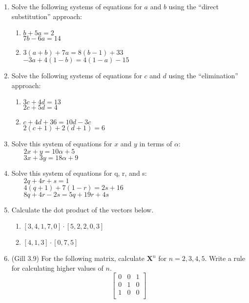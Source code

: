 \documentclass[11pt]{article}
\begin{document}
\begin{enumerate}
\item Solve the following systems of equations for $a$ and $b$ using the ``direct substitution'' approach:
\begin{enumerate}
\item $b + 5a = 2$ \\ $7b - 6a = 14$ %
\item $3(a+b) + 7a = 8(b-1) + 33$ \\ $-3a + 4(1-b) = 4(1-a) - 15$ %
\end{enumerate}



\item Solve the following systems of equations for $c$ and $d$ using the ``elimination'' approach:
\begin{enumerate}
\item $3c + 4d = 13$ \\ $2c + 5d = 4$ %
\item $c + 4d + 36 = 10d - 3c$ \\ $2(c+1) + 2(d+1) = 6$ %
\end{enumerate}


\item Solve this system of equations for $x$ and $y$ in terms of $\alpha$: \\
$~~~~~~~~2x + y = 10\alpha + 5$ \\
$~~~~~~~~3x + 3y = 18\alpha + 9$ %


\item Solve this system of equations for q, r, and s: \\
$~~~~~~~~2q + 4r + s = 1$ \\
$~~~~~~~~4(q+1) + 7(1-r) = 2s + 16$ \\
$~~~~~~~~8q + 4r - 2s = 5q + 19r + 4s$ %


\item Calculate the dot product of the vectors below.
\begin{enumerate}
\item $[3, 4, 1, 7, 0] \cdot [5, 2, 2, 0, 3]$ %
\item $[4, 1, 3] \cdot [0, 7, 5]$ %
\end{enumerate}



\item (Gill 3.9) For the following matrix, calculate $\textbf{X}^n$ for $n = 2, 3, 4, 5$.  Write a rule for calculating higher values of $n$.
\[
\left[\begin{array}{ccc}
0 & 0 & 1 \\
0 & 1 & 0 \\
1 & 0 & 0 \\
\end{array}\right]
\]



\end{enumerate}
\end{document}
